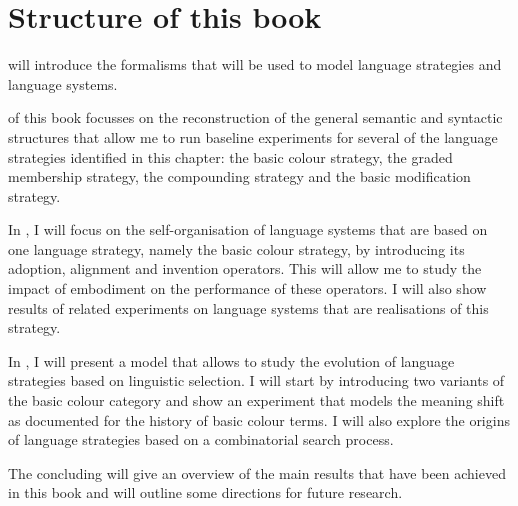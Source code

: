 \section{Structure of this book}

 will introduce the formalisms that will be 
used to model language strategies and language systems.

 of this book focusses on the
reconstruction of the general semantic and syntactic structures that
allow me to run baseline experiments for several of the language
strategies identified in this chapter: the basic colour strategy, the
graded membership strategy, the compounding strategy and the
basic modification strategy.

In , I will focus on the
self-organisation of language systems that are based on one language strategy,
namely the basic colour strategy, by introducing its adoption,
alignment and invention operators. This will allow me to study the
impact of embodiment on the performance of these operators. I will
also show results of related experiments on language systems that are
realisations of this strategy.

In , I
will present a model that allows to study the evolution of language
strategies based on linguistic selection. I will start by introducing
two variants of the basic colour category and show an experiment that
models the meaning shift as documented for the history of basic colour
terms. I will also explore the origins of language strategies based on
a combinatorial search process.

The concluding  will give an overview of
the main results that have been achieved in this book and will
outline some directions for future research.
